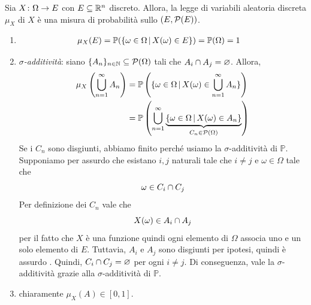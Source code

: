 \documentclass[a4paper]{article}
\begin{document}
\begin{snippetproposition}{}
    Sia \(X \colon \Omega \to E\) con \(E \subseteq \mathbb{R}^n\)
    discreto.
    Allora, la legge di variabili aleatoria discreta \(\mu_X\) di \(X\) è una misura di probabilità
    sullo \((E, \mathcal P(E))\).
\end{snippetproposition}

\begin{snippetproof}{}
    \begin{enumerate}
        \item
            \begin{align*}
                \mu_X(E) &= \mathbb P(\{
                        \omega \in \Omega \,|\,
                        X(\omega) \in E
                \})
                = \mathbb P(\Omega) = 1
            \end{align*}
        \item \emph{\(\sigma\)-additività}:
            siano \(\{A_n\}_{n \in \mathbb{N}} \subseteq \mathcal P(\Omega)\)
            tali che \(A_i \cap A_j = \varnothing\).
            Allora,
            \begin{align*}
                \mu_X\left(
                    \bigcup_{n=1}^\infty A_n
                \right)
                &= \mathbb P\left(
                    \{\omega \in \Omega \,|\,
                        X(\omega) \in \bigcup_{n=1}^\infty A_n
                    \}
                \right) \\
                &= \mathbb P \left(
                    \bigcup_{n=1}^\infty \underbrace{
                        \left\{
                            \omega \in \Omega \,|\, X(\omega) \in A_n
                        \right\}
                    }_{C_n \in \mathcal P(\Omega)}
                \right)
            \end{align*}
            Se i \(C_n\) sono disgiunti, abbiamo finito perché usiamo la \(\sigma\)-additività di \(\mathbb P\).
            Supponiamo per assurdo che esistano \(i,j\) naturali tale che \(i\neq j\)
            e \(\omega \in \Omega\)
            tale che \[
                \omega \in C_i \cap C_j
            \]
            Per definizione dei \(C_n\)
            vale che \[
                X(\omega) \in A_i \cap A_j
            \]
            per il fatto che \(X\) è una funzione quindi ogni elemento di \(\Omega\)
            associa uno e un solo elemento di \(E\).
            Tuttavia, \(A_i\) e \(A_j\) sono disgiunti per ipotesi, quindi è assurdo \lightning.
            Quindi, \(C_i \cap C_j = \varnothing\) per ogni \(i \neq j\).
            Di conseguenza, vale la \(\sigma\)-additività grazie alla
            \(\sigma\)-additività di \(\mathbb P\).
        \item chiaramente \(\mu_X(A) \in [0,1]\).
    \end{enumerate}
\end{snippetproof}
\end{document}

